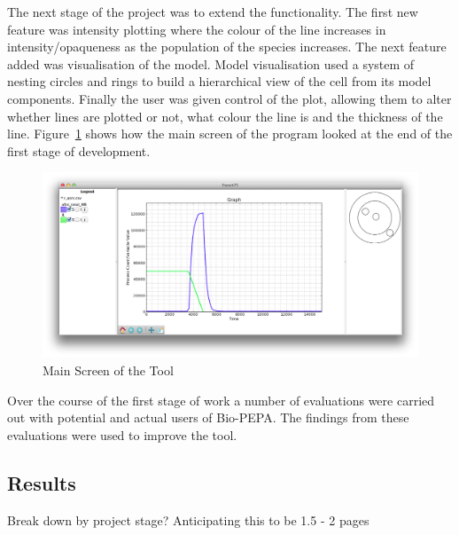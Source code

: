 The next stage of the project was to extend the functionality.  The first new feature was intensity plotting where the colour of the line increases in intensity/opaqueness as the population of the species increases.  The next feature added was visualisation of the model.  Model visualisation used a system of nesting circles and rings to build a hierarchical view of the cell from its model components.  Finally the user was given control of the plot, allowing them to alter whether lines are plotted or not, what colour the line is and the thickness of the line.  Figure~\ref{fig:f75_mac_intro} shows how the main screen of the program looked at the end of the first stage of development.

\begin{figure}[h!]
    \centering
    \includegraphics[width=\textwidth]{images/french75_mac.png}
    \caption{Main Screen of the Tool}
    \label{fig:f75_mac_intro}
\end{figure}

Over the course of the first stage of work a number of evaluations were carried out with potential and actual users of Bio-PEPA.  The findings from these evaluations were used to improve the tool.

\subsection{Results}

Break down by project stage?  Anticipating this to be 1.5 - 2 pages

